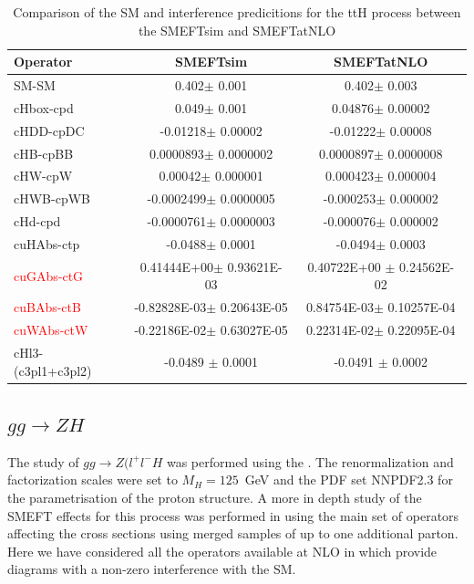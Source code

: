 \begin{table}[h]
\begin{tabular}{|l|c|c|}
\hline
\textbf{Operator} & \textbf{SMEFTsim} & \textbf{SMEFTatNLO} \\
 \hline
 SM-SM & 0.402$\pm$ 0.001& 0.402$\pm$ 0.003\\
 \hline
 cHbox-cpd & 0.049$\pm$ 0.001 & 0.04876$\pm$ 0.00002\\
 \hline
 cHDD-cpDC & -0.01218$\pm$ 0.00002 & -0.01222$\pm$ 0.00008\\
 \hline
 cHB-cpBB & 0.0000893$\pm$ 0.0000002 & 0.0000897$\pm$ 0.0000008\\
 \hline
 cHW-cpW & 0.00042$\pm$ 0.000001& 0.000423$\pm$ 0.000004\\
 \hline
 cHWB-cpWB & -0.0002499$\pm$ 0.0000005& -0.000253$\pm$ 0.000002\\
 \hline
 cHd-cpd & -0.0000761$\pm$ 0.0000003 & -0.000076$\pm$ 0.000002\\
 \hline
 cuHAbs-ctp & -0.0488$\pm$ 0.0001& -0.0494$\pm$ 0.0003\\
 \hline
 \textcolor{red}{cuGAbs-ctG} & 0.41444E+00$\pm$ 0.93621E-03& 0.40722E+00 $\pm$ 0.24562E-02\\
 \hline
 \textcolor{red}{cuBAbs-ctB} & -0.82828E-03$\pm$ 0.20643E-05& 0.84754E-03$\pm$ 0.10257E-04\\
 \hline
 \textcolor{red}{cuWAbs-ctW} & -0.22186E-02$\pm$ 0.63027E-05& 0.22314E-02$\pm$ 0.22095E-04\\
  \hline
 cHl3-(c3pl1+c3pl2) & -0.0489 $\pm$ 0.0001 & -0.0491 $\pm$ 0.0002\\
 \hline
  \end{tabular}
\caption{ Comparison of the SM and interference predicitions for the ttH process between the SMEFTsim and SMEFTatNLO}
\end{table}



\subsection{$gg\to ZH$}
\label{sec:higgseft:section3}
The study of  $gg\to Z(l^{+}l^{-}H$ was performed using the \SMEFTatNLO. The renormalization and factorization scales were set to $M_H=125$~GeV and the PDF set NNPDF2.3 for the parametrisation of the proton structure. A more in depth study of the SMEFT effects for this process was performed in \textcolor{REF} using the main set of operators affecting the cross sections using merged samples of up to one additional parton. Here we have considered all the operators available at NLO in \SMEFTatNLO which provide diagrams with a non-zero interference with the SM.

